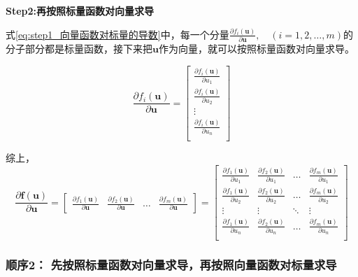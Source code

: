 \documentclass[withoutpreface,bwprint]{NoteBook}
\begin{document}
\textbf{Step2:再按照标量函数对向量求导}

式\cref{eq:step1_向量函数对标量的导数}中，每一个分量$\frac{\partial f_i(\mathbf{u})}{\partial \mathbf{u}},\quad (i=1,2,\dots,m)$的分子部分都是标量函数，接下来把$\mathbf{u}$作为向量，就可以按照标量函数对向量求导。

\begin{equation}
    \label{eq:step2_标量函数对向量求导}
    \frac{\partial f_i(\mathbf{u})}{\partial \mathbf{u}}
    =
    \begin{bmatrix}
        \frac{\partial f_i(\mathbf{u})}{\partial u_1} \\
        \frac{\partial f_i(\mathbf{u})}{\partial u_2} \\
        \vdots \\
        \frac{\partial f_i(\mathbf{u})}{\partial u_n} \\
    \end{bmatrix}
\end{equation}

综上，
\begin{equation}
    \label{eq:向量函数对向量的导数综合式1}
    \frac{\partial \mathbf{f}(\mathbf{u})}{\partial \mathbf{u}} 
    = 
    \begin{bmatrix}
    \frac{\partial f_1(\mathbf{u})}{\partial \mathbf{u}} & \frac{\partial f_2(\mathbf{u})}{\partial \mathbf{u}} & \dots & \frac{\partial f_m(\mathbf{u})}{\partial \mathbf{u}}
    \end{bmatrix} 
    =
    \begin{bmatrix}
        \frac{\partial f_1(\mathbf{u})}{\partial u_1} & \frac{\partial f_2(\mathbf{u})}{\partial u_1} & \dots & \frac{\partial f_m(\mathbf{u})}{\partial u_1} \\
        \frac{\partial f_1(\mathbf{u})}{\partial u_2} & \frac{\partial f_2(\mathbf{u})}{\partial u_2} & \dots & \frac{\partial f_m(\mathbf{u})}{\partial u_2} \\
        \vdots                                        & \vdots                                        & \ddots & \vdots \\
        \frac{\partial f_1(\mathbf{u})}{\partial u_n} & \frac{\partial f_2(\mathbf{u})}{\partial u_n} & \dots &  \frac{\partial f_m(\mathbf{u})}{\partial u_n}\\
    \end{bmatrix}
\end{equation}


\subsubsection{顺序2： 先按照标量函数对向量求导，再按照向量函数对标量求导}
\end{document}
